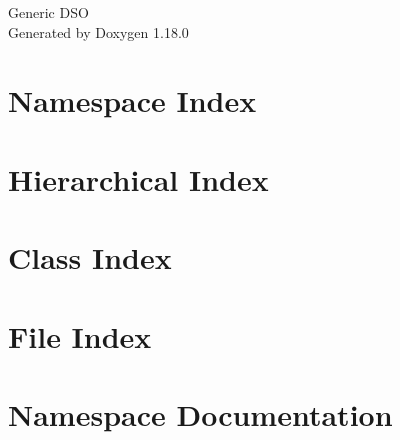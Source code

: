 \documentclass[twoside]{book}
\newcommand{\+}{\discretionary{\mbox{\scriptsize$\hookleftarrow$}}{}{}}
\newcommand{\clearemptydoublepage}{%
    \newpage{\pagestyle{empty}\cleardoublepage}%
  }
\begin{document}
  \raggedbottom
    \hypersetup{pageanchor=false,
                bookmarksnumbered=true,
                pdfencoding=unicode
               }
  \begin{titlepage}
  \vspace*{7cm}
  \begin{center}%
  {\Large Generic DSO}\\
  \vspace*{1cm}
  {\large Generated by Doxygen 1.18.0}\\
  \end{center}
  \end{titlepage}
  \clearemptydoublepage
  \tableofcontents
  \clearemptydoublepage
  \hypersetup{pageanchor=true}
\chapter{Namespace Index}

\chapter{Hierarchical Index}

\chapter{Class Index}

\chapter{File Index}

\chapter{Namespace Documentation}


\end{document}
